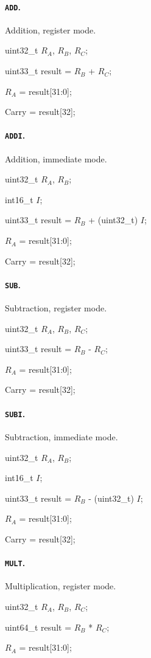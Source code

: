 \documentclass[12pt,english,twoside]{report}
\def\code{\texttt}
\def\subsubsubsection{\paragraph}
\newenvironment{codeblock}
{\begin{list}{}{
\setlength{\rightmargin}{\leftmargin}
\setlength{\listparindent}{0pt}%
\raggedright
\setlength{\itemsep}{0pt}
\setlength{\parsep}{0pt}
\normalfont\ttfamily}%
 \item[]}
{\end{list}}
\begin{document}
\subsubsubsection{\label{sec:Ins_ADD}\code{ADD}.}
Addition, register mode.

\begin{codeblock}
  uint32\_t $R_A$, $R_B$, $R_C$;

  uint33\_t result = $R_B$ + $R_C$;

  $R_A$ = result[31:0];

  Carry = result[32];
\end{codeblock}

\subsubsubsection{\label{sec:Ins_ADDI}\code{ADDI}.}
Addition, immediate mode.

\begin{codeblock}
  uint32\_t $R_A$, $R_B$;

  int16\_t $I$;

  uint33\_t result = $R_B$ + (uint32\_t) $I$;

  $R_A$ = result[31:0];

  Carry = result[32];
\end{codeblock}

\subsubsubsection{\label{sec:Ins_SUB}\code{SUB}.}
Subtraction, register mode.

\begin{codeblock}
  uint32\_t $R_A$, $R_B$, $R_C$;

  uint33\_t result = $R_B$ - $R_C$;

  $R_A$ = result[31:0];

  Carry = result[32];
\end{codeblock}

\subsubsubsection{\label{sec:Ins_SUBI}\code{SUBI}.}
Subtraction, immediate mode.

\begin{codeblock}
  uint32\_t $R_A$, $R_B$;

  int16\_t $I$;

  uint33\_t result = $R_B$ - (uint32\_t) $I$;

  $R_A$ = result[31:0];

  Carry = result[32];
\end{codeblock}

\subsubsubsection{\label{sec:Ins_MULT}\code{MULT}.}
Multiplication, register mode.

\begin{codeblock}
  uint32\_t $R_A$, $R_B$, $R_C$;

  uint64\_t result = $R_B$ * $R_C$;

  $R_A$ = result[31:0];
\end{codeblock}
\end{document}
